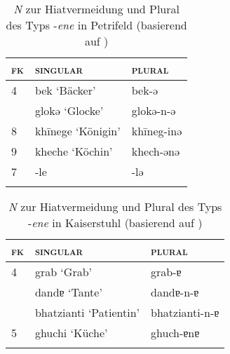 \begin{table}
\caption{\textit{N} zur Hiatvermeidung und Plural des Typs -\textit{ene} in Petrifeld (basierend auf \citealt[59-62]{Moser1937})}\label{table5.10}
\begin{tabular}{lll}
\lsptoprule
{\textsc{fk}} & {\textsc{singular}} & {\textsc{plural}}\\
\midrule
4 & bek ‘Bäcker’ & bek-ə\\
& glokə ‘Glocke’ & glokə-n-ə\\
\midrule
8 & kh\=inege ‘Königin’ & kh\=ineg-inə\\
\midrule
9 & kheche ‘Köchin’ & khech-ənə\\
\midrule
7 & -le & -lə\\
\lspbottomrule
\end{tabular}
\end{table}


\begin{table}
\caption{\textit{N} zur Hiatvermeidung und Plural des Typs -\textit{ene} in Kaiserstuhl (basierend auf \citealt[359-373]{Noth1993})}\label{table5.11}
\begin{tabular}{lll}
\lsptoprule
{\textsc{fk}} & {\textsc{singular}} & {\textsc{plural}}\\
\midrule
4 & grab ‘Grab’ & grab-ɐ\\
& dandɐ ‘Tante’ & dandɐ-n-ɐ\\
& bhatzianti ‘Patientin’ & bhatzianti-n-ɐ\\
\midrule
5 & ghuchi ‘Küche’ & ghuch-ɐnɐ\\
\lspbottomrule
\end{tabular}
\end{table}

